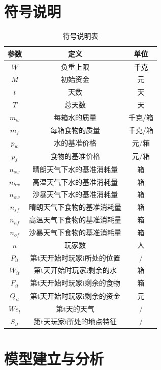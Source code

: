 \documentclass[withoutpre]{cumcmthesis} %
\begin{document}
\section{符号说明}
\begin{table}[H]
    \caption{符号说明表}\label{tab:001} \centering
    \begin{tabular}{ccc}
        \toprule[1.5pt]
        \textbf{参数} & \textbf{定义} & \textbf{单位}\\
        \midrule[1pt]
        $W$ & 负重上限 & 千克\\ 
        $M$ & 初始资金 & 元 \\
        $t$ & 天数 & 天\\
        $T$ & 总天数 & 天\\
        $m_w$ & 每箱水的质量 & 千克/箱\\
        $m_f$ & 每箱食物的质量 & 千克/箱 \\
        $p_w$ & 水的基准价格 & 元/箱\\
        $p_f$ & 食物的基准价格 & 元/箱\\
        $n_{sw}$ & 晴朗天气下水的基准消耗量 & 箱\\
        $n_{hw}$ & 高温天气下水的基准消耗量 & 箱\\
        $n_{ow}$ & 沙暴天气下水的基准消耗量 & 箱\\
        $n_{sf}$ & 晴朗天气下食物的基准消耗量 & 箱\\
        $n_{hf}$ & 高温天气下食物的基准消耗量 & 箱\\
        $n_{of}$ & 沙暴天气下食物的基准消耗量 & 箱\\
        $n$ & 玩家数 & 人 \\
        $P_{it}$ & 第t天开始时玩家i所处的位置 & / \\
        $W_{it}$ & 第t天开始时玩家i剩余的水 & 箱 \\
        $F_{it}$ & 第t天开始时玩家i剩余的食物 & 箱 \\ 
        $Q_{it}$ & 第t天开始时玩家i剩余的资金 & 元 \\
        $We_t$ & 第t天的天气 & /\\
        $S_{it}$ & 第t天玩家i所处的地点特征 & /\\
        \bottomrule[1.5pt]
    \end{tabular}
\end{table}


\section{模型建立与分析}
\end{document}
